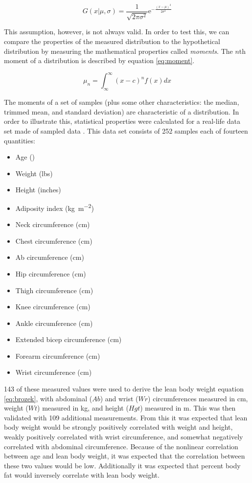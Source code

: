 \documentclass{IEEEtran}
\begin{document}
\begin{equation}
	G(x | \mu, \sigma) = \frac{1}{\sqrt{2 \pi \sigma^2}} \mathrm{e}^{-\frac{(x-\mu)^2}{2 \sigma^2}}
	\label{eq:gauss}
\end{equation}

This assumption, however, is not always valid. In order to test this, we can compare the properties of the measured distribution to the hypothetical distribution by measuring the mathematical properties called \textit{moments}. The $n$th moment of a distribution is described by equation \ref{eq:moment}.

\begin{equation}
	\mu_n = \int_{\infty}^{\infty} (x - c)^n f(x) dx
	\label{eq:moment}
\end{equation}

The moments of a set of samples (plus some other characteristics: the median, trimmed mean, and standard deviation) are characteristic of a distribution. In order to illustrate this, statistical properties were calculated for a real-life data set made of sampled data \cite{Penrose1985}. This data set consists of 252 samples each of fourteen quantities:

\begin{itemize}
	\item Age (\si{\year})
	\item Weight (lbs)
	\item Height (inches)
	\item Adiposity index (\si{\kilo\gram\per\meter^2})
	\item Neck circumference (\si{\centi\meter})
	\item Chest circumference (\si{\centi\meter})
	\item Ab circumference (\si{\centi\meter})
	\item Hip circumference (\si{\centi\meter})
	\item Thigh circumference (\si{\centi\meter})
	\item Knee circumference (\si{\centi\meter})
	\item Ankle circumference (\si{\centi\meter})
	\item Extended bicep circumference (\si{\centi\meter})
	\item Forearm circumference (\si{\centi\meter})
	\item Wrist circumference (\si{\centi\meter})
\end{itemize}

\num{143} of these measured values were used to derive the lean body weight equation \ref{eq:brozek}, with abdominal ($Ab$) and wrist ($Wr$) circumferences measured in \si{\centi\meter}, weight ($Wt$) measured in \si{\kilo\gram}, and height ($Hgt$) measured in \si{\meter}. This was then validated with \num{109} additional measurements. From this it was expected that lean body weight would be strongly positively correlated with weight and height, weakly positively correlated with wrist circumference, and somewhat negatively correlated with abdominal circumference. Because of the nonlinear correlation between age and lean body weight, it was expected that the correlation between these two values would be low. Additionally it was expected that percent body fat would inversely correlate with lean body weight.
\end{document}

